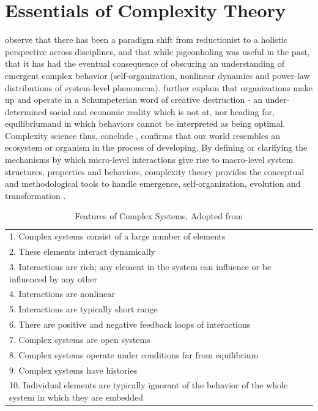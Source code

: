 \documentclass[12pt]{article}
\begin{document}
\section{Essentials of Complexity Theory}\label{S:ComplexityTheory}
\cite{Eisenhardt2011} observe that there has been a paradigm shift from reductionist to a holistic perspective across disciplines, and that while pigeonholing was useful in the past, that it has had the eventual consequence of obscuring an understanding of emergent complex behavior (self-organization, nonlinear dynamics and power-law distributions of system-level phenomena). \cite{Maguire2011} further explain that organizations make up and operate in a Schumpeterian word of creative destruction - an under-determined social and economic reality which is not at, nor heading for, \textquotesingle equilibrium\textquotesingle  and in which behaviors cannot be interpreted as being \textquotesingle optimal\textquotesingle.  Complexity science thus, conclude \cite{Maguire2011}, confirms that our world resembles an ecosystem or organism in the process of developing. By defining or clarifying the mechanisms by which micro-level interactions give rise to macro-level system structures, properties and behaviors, complexity theory provides the conceptual and methodological tools to handle emergence, self-organization, evolution and transformation \citep{Maguire2011}.                                               
\setlength{\arrayrulewidth}{0.5mm}
\renewcommand{\arraystretch}{1.5}

\begin{table}[h!]
\begin{tabu} to 1.0\textwidth { |X[l]|} 
. Complex systems consist of a large number of elements\\
2. These elements interact dynamically\\
3.	Interactions are rich; any element in the system can influence or be influenced by any other\\
4.	Interactions are nonlinear\\
5.	Interactions are typically short range\\
6.	There are positive and negative feedback loops of interactions\\
7.	Complex systems are open systems\\
8.	Complex systems operate under conditions far from equilibrium\\
9.	Complex systems have histories\\
10.	Individual elements are typically ignorant of the behavior of the whole system in which they are embedded\\
\hline 
\end{tabu}
\caption{Features of Complex Systems, Adopted from \cite{Cilliers1998}}
\label{tab:features}
\end{table}
\end{document}
